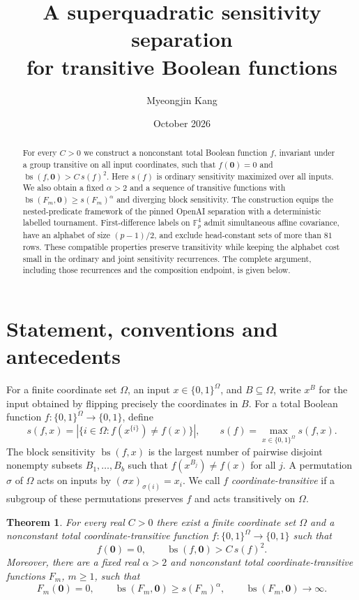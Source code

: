 \documentclass[11pt]{article}
\title{A superquadratic sensitivity separation\texorpdfstring{\\}{ }for transitive Boolean functions}
\author{Myeongjin Kang}
\date{October 2026}
\newtheorem{theorem}{Theorem}[section]
\theoremstyle{definition}
\DeclareMathOperator{\bs}{bs}
\newcommand{\F}{\mathbb F}
\newcommand{\bits}{\{0,1\}}
\newcommand{\zero}{\mathbf 0}
\begin{document}
\maketitle
\begin{abstract}
For every $C>0$ we construct a nonconstant total Boolean function $f$, invariant under a group transitive on all input coordinates, such that $f(\zero)=0$ and $\bs(f,\zero)>C\,s(f)^2$. Here $s(f)$ is ordinary sensitivity maximized over all inputs. We also obtain a fixed $\alpha>2$ and a sequence of transitive functions with $\bs(F_m,\zero)\ge s(F_m)^\alpha$ and diverging block sensitivity. The construction equips the nested-predicate framework of the pinned OpenAI separation with a deterministic labelled tournament. First-difference labels on $\F_p^4$ admit simultaneous affine covariance, have an alphabet of size $(p-1)/2$, and exclude head-constant sets of more than $81$ rows. These compatible properties preserve transitivity while keeping the alphabet cost small in the ordinary and joint sensitivity recurrences. The complete argument, including those recurrences and the composition endpoint, is given below.
\end{abstract}

\section{Statement, conventions and antecedents}
For a finite coordinate set $\Omega$, an input $x\in\bits^\Omega$, and $B\subseteq\Omega$, write $x^B$ for the input obtained by flipping precisely the coordinates in $B$. For a total Boolean function $f:\bits^\Omega\to\bits$, define
\[
 s(f,x)=|\{i\in\Omega:f(x^{\{i\}})\ne f(x)\}|,
 \qquad s(f)=\max_{x\in\bits^\Omega}s(f,x).
\]
The block sensitivity $\bs(f,x)$ is the largest number of pairwise disjoint nonempty subsets $B_1,\ldots,B_b$ such that $f(x^{B_j})\ne f(x)$ for all $j$. A permutation $\sigma$ of $\Omega$ acts on inputs by $(\sigma x)_{\sigma(i)}=x_i$. We call $f$ \emph{coordinate-transitive} if a subgroup of these permutations preserves $f$ and acts transitively on $\Omega$.

\begin{theorem}\label{thm:main}
For every real $C>0$ there exist a finite coordinate set $\Omega$ and a nonconstant total coordinate-transitive function $f:\bits^\Omega\to\bits$ such that
\[
 f(\zero)=0,\qquad \bs(f,\zero)>C\,s(f)^2.
\]
Moreover, there are a fixed real $\alpha>2$ and nonconstant total coordinate-transitive functions $F_m$, $m\ge1$, such that
\[
 F_m(\zero)=0,\qquad
 \bs(F_m,\zero)\ge s(F_m)^\alpha,\qquad
 \bs(F_m,\zero)\longrightarrow\infty.
\]
\end{theorem}
\end{document}
